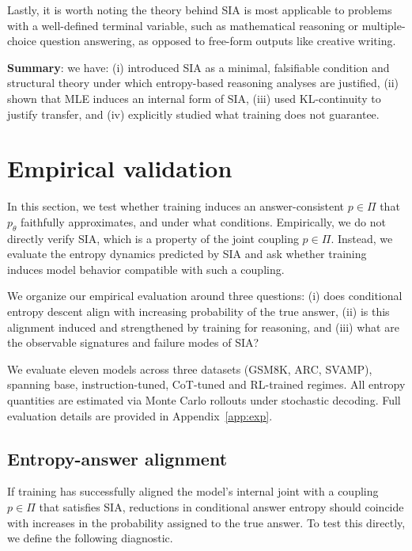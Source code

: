 \documentclass{article}
\begin{document}
Lastly, it is worth noting the theory behind SIA is most applicable to problems with a well-defined terminal variable, such as mathematical reasoning or multiple-choice question answering, as opposed to free-form outputs like creative writing.

\begin{summarybox}
\textbf{Summary}: we have: (i) introduced SIA as a minimal, falsifiable condition and structural theory under which entropy-based reasoning analyses are justified, (ii) shown that MLE induces an internal form of SIA, (iii) used KL-continuity to justify transfer, and (iv) explicitly studied what training does not guarantee.
\end{summarybox}
\section{Empirical validation}

In this section, we test whether training induces an answer-consistent $p\in\Pi$ that $p_\theta$ faithfully approximates, and under what conditions. Empirically, we do not directly verify SIA, which is a property of the joint coupling $p \in \Pi$. Instead, we evaluate the entropy dynamics predicted by SIA and ask whether training induces model behavior compatible with such a coupling.

We organize our empirical evaluation around three questions: (i) does conditional entropy descent align with increasing probability of the true answer, (ii) is this alignment induced and strengthened by training for reasoning, and (iii) what are the observable signatures and failure modes of SIA?

We evaluate eleven models across three datasets (GSM8K, ARC, SVAMP), spanning base, instruction-tuned, CoT-tuned and RL-trained regimes. All entropy quantities are estimated via Monte Carlo rollouts under stochastic decoding. Full evaluation details are provided in Appendix~\ref{app:exp}.

\subsection{Entropy-answer alignment}

If training has successfully aligned the model’s internal joint with a coupling $p\in\Pi$ that satisfies SIA, reductions in conditional answer entropy should coincide with increases in the probability assigned to the true answer. To test this directly, we define the following diagnostic.
\end{document}
